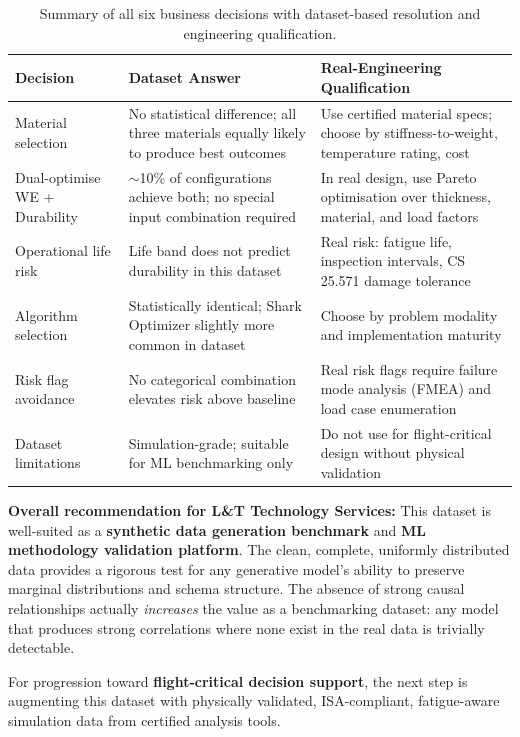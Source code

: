 \documentclass[11pt, a4paper]{report}
\begin{document}
\begin{table}[H]
\centering
\caption{Summary of all six business decisions with dataset-based resolution and engineering qualification.}
\label{tab:decisions}
\begin{tabularx}{\textwidth}{lXX}
\toprule
\textbf{Decision} & \textbf{Dataset Answer} & \textbf{Real-Engineering Qualification} \\
\midrule
Material selection & No statistical difference; all three materials equally likely to produce best outcomes & Use certified material specs; choose by stiffness-to-weight, temperature rating, cost \\[6pt]
Dual-optimise WE + Durability & $\sim$10\% of configurations achieve both; no special input combination required & In real design, use Pareto optimisation over thickness, material, and load factors \\[6pt]
Operational life risk & Life band does not predict durability in this dataset & Real risk: fatigue life, inspection intervals, CS 25.571 damage tolerance \\[6pt]
Algorithm selection & Statistically identical; Shark Optimizer slightly more common in dataset & Choose by problem modality and implementation maturity \\[6pt]
Risk flag avoidance & No categorical combination elevates risk above baseline & Real risk flags require failure mode analysis (FMEA) and load case enumeration \\[6pt]
Dataset limitations & Simulation-grade; suitable for ML benchmarking only & Do not use for flight-critical design without physical validation \\
\bottomrule
\end{tabularx}
\end{table}

\begin{recommendbox}
\textbf{Overall recommendation for L\&T Technology Services:}
This dataset is well-suited as a \textbf{synthetic data generation benchmark} and \textbf{ML methodology validation platform}. The clean, complete, uniformly distributed data provides a rigorous test for any generative model's ability to preserve marginal distributions and schema structure. The absence of strong causal relationships actually \emph{increases} the value as a benchmarking dataset: any model that produces strong correlations where none exist in the real data is trivially detectable.

For progression toward \textbf{flight-critical decision support}, the next step is augmenting this dataset with physically validated, ISA-compliant, fatigue-aware simulation data from certified analysis tools.
\end{recommendbox}
\end{document}
